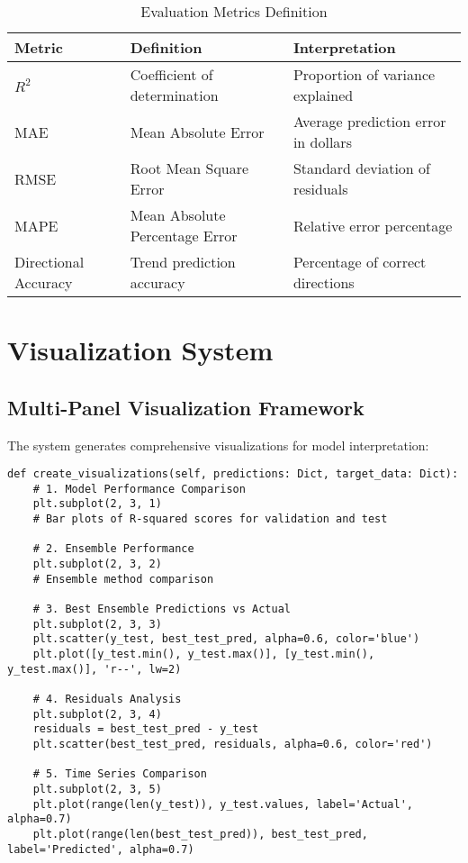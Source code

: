 \documentclass[12pt,a4paper]{article}
\begin{document}
\begin{table}[h]
\centering
\begin{tabular}{@{}lll@{}}
\toprule
\textbf{Metric} & \textbf{Definition} & \textbf{Interpretation} \\
\midrule
$R^2$ & Coefficient of determination & Proportion of variance explained \\
MAE & Mean Absolute Error & Average prediction error in dollars \\
RMSE & Root Mean Square Error & Standard deviation of residuals \\
MAPE & Mean Absolute Percentage Error & Relative error percentage \\
Directional Accuracy & Trend prediction accuracy & Percentage of correct directions \\
\bottomrule
\end{tabular}
\caption{Evaluation Metrics Definition}
\end{table}

\section{Visualization System}

\subsection{Multi-Panel Visualization Framework}

The system generates comprehensive visualizations for model interpretation:

\begin{lstlisting}[caption=Visualization Generation]
def create_visualizations(self, predictions: Dict, target_data: Dict):
    # 1. Model Performance Comparison
    plt.subplot(2, 3, 1)
    # Bar plots of R-squared scores for validation and test
    
    # 2. Ensemble Performance
    plt.subplot(2, 3, 2)
    # Ensemble method comparison
    
    # 3. Best Ensemble Predictions vs Actual
    plt.subplot(2, 3, 3)
    plt.scatter(y_test, best_test_pred, alpha=0.6, color='blue')
    plt.plot([y_test.min(), y_test.max()], [y_test.min(), y_test.max()], 'r--', lw=2)
    
    # 4. Residuals Analysis
    plt.subplot(2, 3, 4)
    residuals = best_test_pred - y_test
    plt.scatter(best_test_pred, residuals, alpha=0.6, color='red')
    
    # 5. Time Series Comparison
    plt.subplot(2, 3, 5)
    plt.plot(range(len(y_test)), y_test.values, label='Actual', alpha=0.7)
    plt.plot(range(len(best_test_pred)), best_test_pred, label='Predicted', alpha=0.7)
\end{lstlisting}
\end{document}
